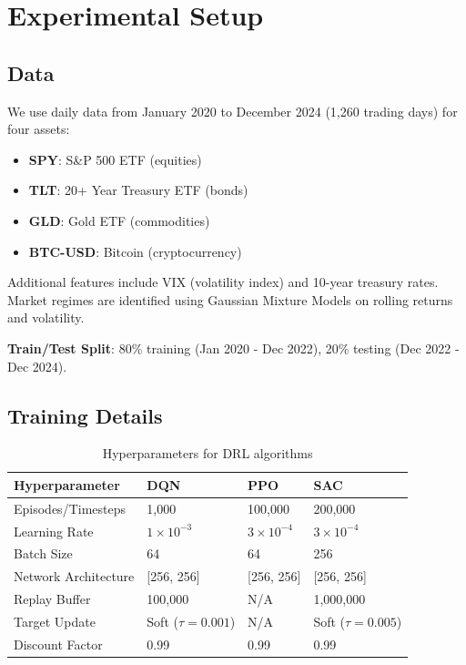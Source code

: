 \documentclass[12pt]{article}
\begin{document}
\section{Experimental Setup}

\subsection{Data}

We use daily data from January 2020 to December 2024 (1,260 trading days) for four assets:

\begin{itemize}
    \item \textbf{SPY}: S\&P 500 ETF (equities)
    \item \textbf{TLT}: 20+ Year Treasury ETF (bonds)
    \item \textbf{GLD}: Gold ETF (commodities)
    \item \textbf{BTC-USD}: Bitcoin (cryptocurrency)
\end{itemize}

Additional features include VIX (volatility index) and 10-year treasury rates. Market regimes are identified using Gaussian Mixture Models on rolling returns and volatility.

\textbf{Train/Test Split}: 80\% training (Jan 2020 - Dec 2022), 20\% testing (Dec 2022 - Dec 2024).

\subsection{Training Details}

\begin{table}[h]
\centering
\begin{tabular}{llll}
\toprule
\textbf{Hyperparameter} & \textbf{DQN} & \textbf{PPO} & \textbf{SAC} \\
\midrule
Episodes/Timesteps & 1,000 & 100,000 & 200,000 \\
Learning Rate & $1 \times 10^{-3}$ & $3 \times 10^{-4}$ & $3 \times 10^{-4}$ \\
Batch Size & 64 & 64 & 256 \\
Network Architecture & [256, 256] & [256, 256] & [256, 256] \\
Replay Buffer & 100,000 & N/A & 1,000,000 \\
Target Update & Soft ($\tau=0.001$) & N/A & Soft ($\tau=0.005$) \\
Discount Factor & 0.99 & 0.99 & 0.99 \\
\bottomrule
\end{tabular}
\caption{Hyperparameters for DRL algorithms}
\label{tab:hyperparams}
\end{table}
\end{document}
